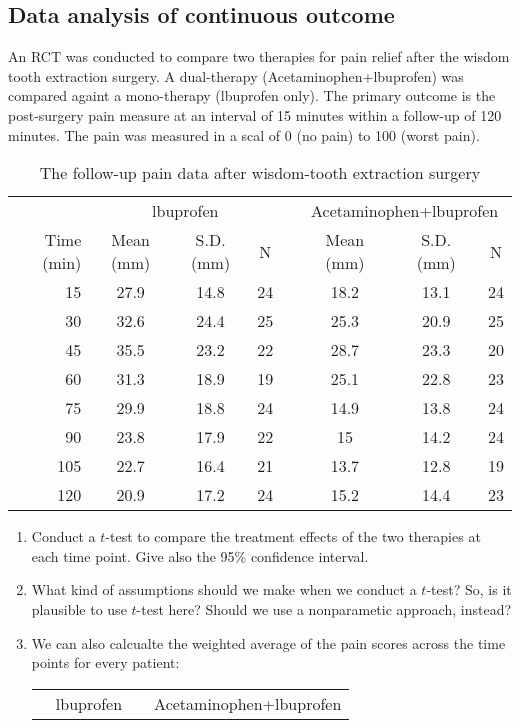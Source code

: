 \documentclass[a4paper,11pt]{article}
\begin{document}
\begin{CJK*}{UTF8}{gbsn}
\section{Data analysis of continuous outcome}
An RCT was conducted to compare two therapies for pain relief after the wisdom tooth 
extraction surgery. A dual-therapy (Acetaminophen+lbuprofen) was compared againt a 
mono-therapy (lbuprofen only). The primary outcome is the post-surgery pain measure 
at an interval of 15 minutes within a follow-up of 120 minutes. The pain was measured 
in a scal of 0 (no pain) to 100 (worst pain).
\begin{table}[t]
\caption{The follow-up pain data after wisdom-tooth extraction surgery}
\begin{tabular}{rccccccc}
\hline
 & \multicolumn{3}{c}{lbuprofen} & &\multicolumn{3}{c}{Acetaminophen+lbuprofen}\\
\cline{2-4} \cline{6-8}
Time (min) & Mean (mm) & S.D. (mm) & N & & Mean (mm) & S.D. (mm) & N\\
\hline
15 & 27.9 & 14.8 & 24 & & 18.2 & 13.1 & 24\\
30 & 32.6 & 24.4 & 25 & & 25.3 & 20.9 & 25\\
45 & 35.5 & 23.2 & 22 & & 28.7 & 23.3 & 20\\
60 & 31.3 & 18.9 & 19 & & 25.1 & 22.8 & 23\\
75 & 29.9 & 18.8 & 24 & & 14.9 & 13.8 & 24\\
90 & 23.8 & 17.9 & 22 & & 15 & 14.2 & 24\\
105 & 22.7 & 16.4 & 21 & & 13.7 & 12.8 & 19\\
120 & 20.9 & 17.2 & 24 & & 15.2 & 14.4 & 23\\
\hline
\end{tabular}
\end{table}
\begin{enumerate}[(1)]
	\item Conduct a $t$-test to compare the treatment effects of the two therapies 
		at each time point. Give also the 95\% confidence interval.
	\item What kind of assumptions should we make when we conduct a $t$-test? So, 
		is it plausible to use $t$-test here? Should we use a nonparametic 
		approach, instead?
	\item We can also calcualte the weighted average of the pain scores across 
		the time points for every patient:
\begin{table}[h]
\begin{tabular}{rccccccc}
\hline
 & \multicolumn{3}{c}{lbuprofen} & &\multicolumn{3}{c}{Acetaminophen+lbuprofen}\\

\end{tabular}
\end{table}
\end{enumerate}
\end{CJK*}
\end{document}
